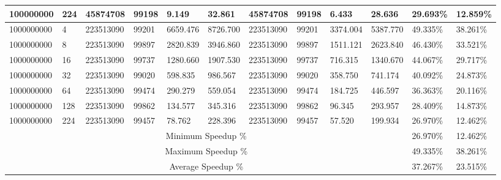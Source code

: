 \begin{tabular}{|l|l|l|l|l|l|l|l|l|l|l|l| }
100000000 &  224 & 45874708 & 99198 & 9.149& 32.861& 45874708 & 99198 & 6.433& 28.636 & 29.693\% & 12.859\% \\ \hline 
1000000000 &  4 & 223513090 & 99201 & 6659.476& 8726.700& 223513090 & 99201 & 3374.004& 5387.770 & 49.335\% & 38.261\% \\ \hline 
1000000000 &  8 & 223513090 & 99897 & 2820.839& 3946.860& 223513090 & 99897 & 1511.121& 2623.840 & 46.430\% & 33.521\% \\ \hline 
1000000000 &  16 & 223513090 & 99737 & 1280.660& 1907.530& 223513090 & 99737 & 716.315& 1340.670 & 44.067\% & 29.717\% \\ \hline 
1000000000 &  32 & 223513090 & 99020 & 598.835& 986.567& 223513090 & 99020 & 358.750& 741.174 & 40.092\% & 24.873\% \\ \hline 
1000000000 &  64 & 223513090 & 99474 & 290.279& 559.054& 223513090 & 99474 & 184.725& 446.597 & 36.363\% & 20.116\% \\ \hline 
1000000000 &  128 & 223513090 & 99862 & 134.577& 345.316& 223513090 & 99862 & 96.345& 293.957 & 28.409\% & 14.873\% \\ \hline 
1000000000 &  224 & 223513090 & 99457 & 78.762& 228.396& 223513090 & 99457 & 57.520& 199.934 & 26.970\% & 12.462\% \\ \hline 
\hline
\multicolumn{10}{|c|}{Minimum Speedup \%} & 26.970\% & 12.462\% \\ 
\hline
\multicolumn{10}{|c|}{Maximum Speedup \%} & 49.335\% & 38.261\% \\ \hline 
\hline
\multicolumn{10}{|c|}{Average Speedup \%} & 37.267\% & 23.515\% \\ \hline 
\end{tabular}
